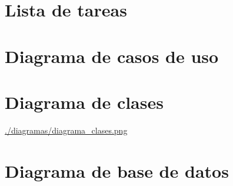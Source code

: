 \documentclass[a4paper, 10pt, twoside]{book}
\begin{document}
% 

% 

% 

% 

% 

% 
% 



\newpage
\setcounter{chapter}{0}
\def\thechapter{\Alph{chapter}}
\renewcommand{\chaptername}{Anexo }
\chapter{Lista de tareas}
\label{tareas}
\chapter{Diagrama de casos de uso}
\label{casosuso}
\chapter{Diagrama de clases}
\label{clases}
\url{./diagramas/diagrama_clases.png}

\chapter{Diagrama de base de datos}

%
%
\end{document}
